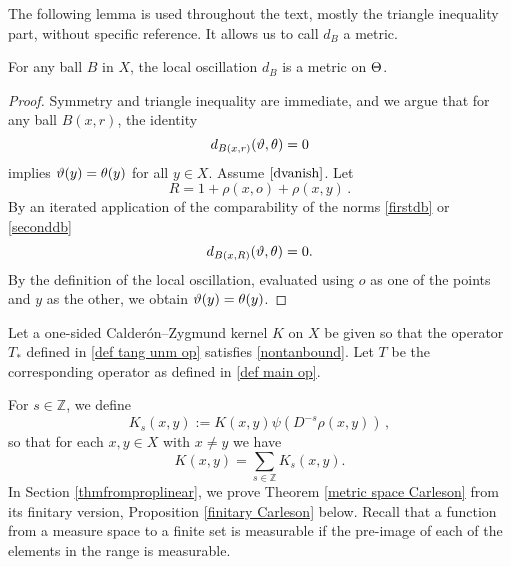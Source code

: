 The following lemma is used throughout the text, mostly
the triangle inequality part, without specific reference.
It allows us to call $d_B$ a metric.

\begin{lemma}
    For any ball $B$ in $X$, the local oscillation
$d_{B}$ is a metric on $\Theta$.
\end{lemma}

\begin{proof}
    Symmetry and triangle inequality are immediate, and we argue that
for any ball $B(x,r)$, the identity
\begin{equation}\label{dvanish}
d_{B(x,r)}(\vartheta,\theta)=0
\end{equation}
implies $\vartheta(y)=\theta(y)$ for all $y\in X$. Assume $\eqref{dvanish}$.
Let
\begin{equation}
    R=1+\rho(x,o)+\rho(x,y)\, .
\end{equation}
By an iterated application of
the comparability of the norms \eqref{firstdb} or \eqref{seconddb}
\begin{equation}
    d_{B(x,R)}(\vartheta,\theta)=0.
\end{equation}
By the definition of
the local oscillation, evaluated using $o$ as one of the points and $y$ as the other, we obtain
$\vartheta(y)=\theta(y)$.
\end{proof}

Let a one-sided Calder\'on--Zygmund kernel $K$ on $X$ be given so that the operator $T_*$ defined in \eqref{def tang unm op}
satisfies
\eqref{nontanbound}. Let $T$ be the corresponding operator as defined in \eqref{def main op}.


For $s\in\mathbb{Z}$, we define
\begin{equation}\label{defks}
    K_s(x,y):=K(x,y)\psi(D^{-s}\rho(x,y))\,,
\end{equation}
so that for each $x, y \in X$ with $x\neq y$  we have
$$K(x,y)=\sum_{s\in\mathbb{Z}}K_s(x,y).$$
 In Section \ref{thmfromproplinear}, we prove Theorem \ref{metric space Carleson}
 from its finitary version, Proposition \ref{finitary Carleson} below. Recall
 that a function from a measure space to a finite set is measurable if the pre-image of each of the elements in the range is measurable.


